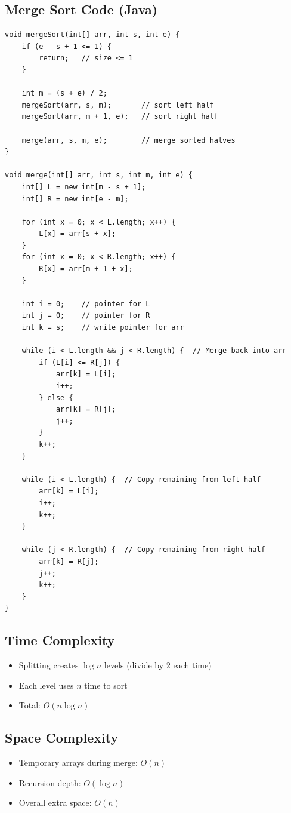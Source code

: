 \subsection{Merge Sort Code (Java)}
\begin{verbatim}
void mergeSort(int[] arr, int s, int e) {
    if (e - s + 1 <= 1) {
        return;   // size <= 1
    }

    int m = (s + e) / 2;
    mergeSort(arr, s, m);       // sort left half
    mergeSort(arr, m + 1, e);   // sort right half

    merge(arr, s, m, e);        // merge sorted halves
}

void merge(int[] arr, int s, int m, int e) {
    int[] L = new int[m - s + 1];
    int[] R = new int[e - m];

    for (int x = 0; x < L.length; x++) {
        L[x] = arr[s + x];
    }
    for (int x = 0; x < R.length; x++) {
        R[x] = arr[m + 1 + x];
    }

    int i = 0;    // pointer for L
    int j = 0;    // pointer for R
    int k = s;    // write pointer for arr

    while (i < L.length && j < R.length) {  // Merge back into arr
        if (L[i] <= R[j]) {
            arr[k] = L[i];
            i++;
        } else {
            arr[k] = R[j];
            j++;
        }
        k++;
    }

    while (i < L.length) {  // Copy remaining from left half
        arr[k] = L[i];
        i++;
        k++;
    }

    while (j < R.length) {  // Copy remaining from right half
        arr[k] = R[j];
        j++;
        k++;
    }
}
\end{verbatim}


\subsection{Time Complexity}
\begin{itemize}
  \item Splitting creates $\log n$ levels (divide by 2 each time)
  \item Each level uses $n$ time to sort
  \item Total: \textbf{$O(n\log n)$}
\end{itemize}

\subsection{Space Complexity}
\begin{itemize}
  \item Temporary arrays during merge: $O(n)$
  \item Recursion depth: $O(\log n)$
  \item Overall extra space: \textbf{$O(n)$}
\end{itemize}